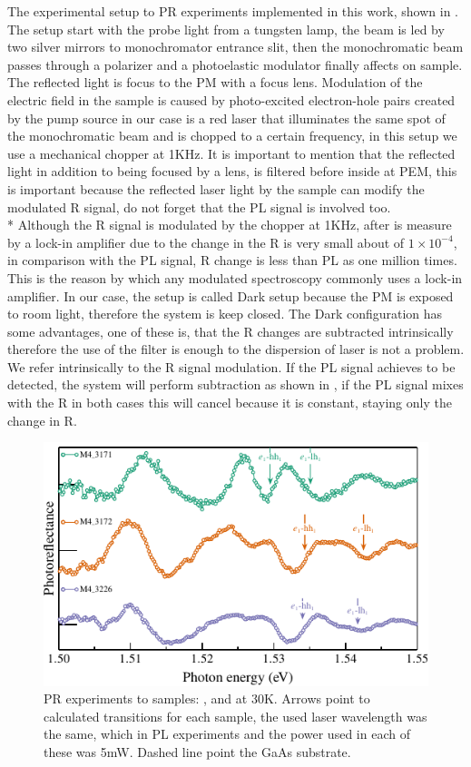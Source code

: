The experimental setup to PR experiments implemented in this work, shown in . The setup start with the probe light from a tungsten lamp, the beam is led by two silver mirrors to monochromator entrance slit, then the monochromatic beam passes through a polarizer and a photoelastic modulator finally affects on sample. The reflected light is focus to the PM with a focus lens. Modulation of the electric field in the sample is caused by photo-excited electron-hole pairs created by the pump source in our case is a red laser that illuminates the same spot of the monochromatic beam and is chopped to a certain frequency, in this setup we use a mechanical chopper at 1KHz. It is important to mention that the reflected light in addition to being  focused by a lens, is filtered before inside at PEM, this is important because the reflected laser light by the sample can modify the modulated R signal, do not forget that the PL signal is involved too. \\*
Although the R signal is modulated by the chopper at 1KHz, after is measure by a lock-in amplifier due to the change in the R is very small about of  $1\times 10^{-4}$,  in comparison with the  PL signal, R change is less than PL as one million times. This is the reason by which any modulated spectroscopy commonly uses a lock-in amplifier. In our case, the setup is called Dark\cite{misiewicz1999photoreflectance} setup because the PM is exposed to room light, therefore the system is keep closed. The  Dark configuration has some advantages, one of these is, that the R changes are subtracted intrinsically therefore the use of the filter is enough to the dispersion of laser is not a problem.  We refer intrinsically to the R signal modulation. If the PL signal achieves to be detected,  the system will perform subtraction as shown in , if the PL signal mixes with the R in both cases this will cancel because it is constant,  staying only the change in R. 
\begin{figure}[ht!]
	\centering
	\includegraphics[width=\textwidth]{../figures/chapter-3/pr-plots/build-ruco/pr-set1.pdf}
	\caption{ PR experiments to samples: ,  and  at 30K. Arrows point to calculated transitions for each sample, the used laser wavelength was the same, which in PL experiments and the power used in each of these was 5mW. Dashed line point the GaAs substrate.}
	\label{fig:chapter-3-PR-PLOT-SET1}
\end{figure}

